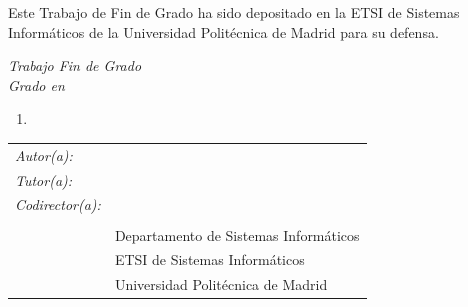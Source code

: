 \begin{titlepage}
\newpage
\thispagestyle{empty}
\noindent
Este Trabajo de Fin de Grado ha sido depositado en la ETSI de Sistemas\\Informáticos de la Universidad Politécnica de Madrid para su defensa.

\vspace*{4cm}
\noindent
\textit{Trabajo Fin de Grado}\\
\textit{Grado en} \Grado{}

\begin{enumerate}
\item[\textit{Título:}] \TituloTFG{}
\end{enumerate}
\Fecha

\vspace*{3cm}

\noindent
\begin{tabular}{ll}
\textit{Autor(a):}&\NombreAutor{}\\ 
\textit{Tutor(a):}&\NombreTutor{}\\ 
\textit{Codirector(a):}&\NombreCodirector{}\\\\ 
                &Departamento de Sistemas Informáticos\\
                &ETSI de Sistemas Informáticos\\
                &Universidad Politécnica de Madrid
\end{tabular} 
\end{titlepage}